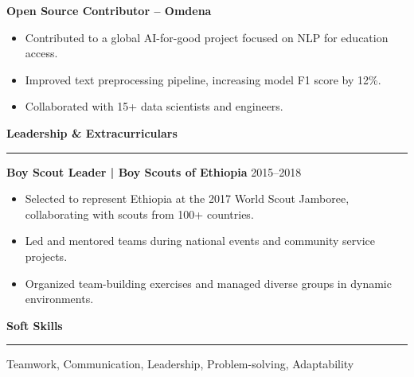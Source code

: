 \documentclass[a4paper,10pt]{article}
\newcommand{\resumeItem}[1]{\item #1}
\newcommand{\resumeSection}[1]{\vspace{6pt}\textbf{\large #1}\vspace{2pt}\hrule\vspace{4pt}}
\begin{document}
\textbf{Open Source Contributor – Omdena} \\[-2pt]
\begin{itemize}[leftmargin=*, noitemsep]
  \resumeItem{Contributed to a global AI-for-good project focused on NLP for education access.}
  \resumeItem{Improved text preprocessing pipeline, increasing model F1 score by 12\%.}
  \resumeItem{Collaborated with 15+ data scientists and engineers.}
\end{itemize}

\resumeSection{Leadership \& Extracurriculars}
\textbf{Boy Scout Leader | Boy Scouts of Ethiopia} \hfill 2015--2018
\begin{itemize}[leftmargin=*, noitemsep]
  \resumeItem{Selected to represent Ethiopia at the 2017 World Scout Jamboree, collaborating with scouts from 100+ countries.}
  \resumeItem{Led and mentored teams during national events and community service projects.}
  \resumeItem{Organized team-building exercises and managed diverse groups in dynamic environments.}
\end{itemize}

\resumeSection{Soft Skills}
Teamwork, Communication, Leadership, Problem-solving, Adaptability
\end{document}
